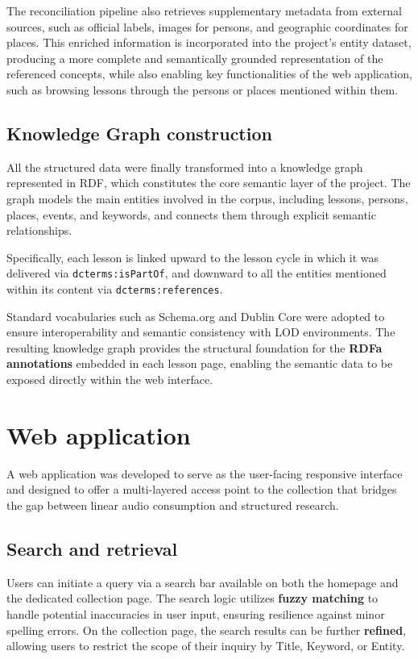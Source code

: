 \documentclass[11pt]{article}
\begin{document}
The reconciliation pipeline also retrieves supplementary metadata from external sources, such as official labels, images for persons, and geographic coordinates for places. This enriched information is incorporated into the project’s entity dataset, producing a more complete and semantically grounded representation of the referenced concepts, while also enabling key functionalities of the web application, such as browsing lessons through the persons or places mentioned within them.


\subsection{Knowledge Graph construction}
All the structured data were finally transformed into a knowledge graph represented in RDF, which constitutes the core semantic layer of the project. The graph models the main entities involved in the corpus, including lessons, persons, places, events, and keywords, and connects them through explicit semantic relationships. 

Specifically, each lesson is linked upward to the lesson cycle in which it was delivered via \texttt{dcterms:isPartOf}, and downward to all the entities mentioned within its content via \texttt{dcterms:references}.

Standard vocabularies such as Schema.org and Dublin Core were adopted to ensure interoperability and semantic consistency with LOD environments. The resulting knowledge graph provides the structural foundation for the \textbf{RDFa annotations} embedded in each lesson page, enabling the semantic data to be exposed directly within the web interface.


\section{Web application}
A web application was developed to serve as the user-facing responsive interface and designed to offer a multi-layered access point to the collection that bridges the gap between linear audio consumption and structured research.

\subsection{Search and retrieval}
Users can initiate a query via a search bar available on both the homepage and the dedicated collection page. The search logic utilizes \textbf{fuzzy matching} to handle potential inaccuracies in user input, ensuring resilience against minor spelling errors. On the collection page, the search results can be further \textbf{refined}, allowing users to restrict the scope of their inquiry by Title, Keyword, or Entity.
\end{document}
